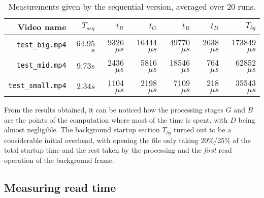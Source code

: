 \documentclass{article}
\begin{document}
\begin{table}[H]
\centering
\begin{tabular}{r||r||r|r|r|r||r}
\hline
   Video name & $T_{seq}$ & $t_R$ & $t_G$  & $t_B$ & $t_D$  & $T_{bg}$ \\
\hline                                                    
   \texttt{test\_big.mp4}   & 64.95$s$ & 9326$\mu s$ & 16444$\mu s$ & 49770$\mu s$ & 2638$\mu s$ & 173849$\mu s$\\
   \texttt{test\_mid.mp4}   & 9.73$s$  & 2436$\mu s$ & 5816$\mu s$ & 18546$\mu s$ & 764$\mu s$ & 62852$\mu s$\\
   \texttt{test\_small.mp4} & 2.34$s$  & 1104$\mu s$ & 2198$\mu s$ & 7109$\mu s$ & 218$\mu s$ & 35543$\mu s$\\
  \hline
  \end{tabular}
\caption{Measurements given by the sequential version, averaged over 20 runs.}
\label{tbl:measurements}
\end{table}

From the results obtained, it can be noticed how the processing stages $G$ and $B$ are the points of the computation where most of the time is spent, with $D$ being almost negligible. The background startup section $T_{bg}$ turned out to be a considerable initial overhead, with opening the file only taking 20\%/25\% of the total startup time and the rest taken by the processing and the \emph{first} read operation of the background frame. %


\subsection{Measuring read time}\label{sec:measuring_read}
\end{document}
